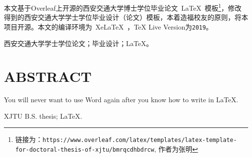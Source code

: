
\clearpage
\titlespacing{\chapter}{0pt}{0mm}{5mm}



本文基于Overleaf上开源的西安交通大学博士学位毕业论文~\LaTeX~模板\footnote{链接为：\texttt{https://www.overleaf.com/latex/templates/latex-template-for-doctoral-thesis-of-xjtu/bmrqcdhbdrcw}, 作者为张明}，修改得到的西安交通大学学士学位毕业设计（论文）模板，本着造福校友的原则，将本项目开源。{\color{red}本文的编译环境为~XeLaTeX~，TeX Live Version为\texttt{2019}}。

\vspace{\baselineskip}
 西安交通大学学士学位论文；毕业设计；\LaTeX。


\clearpage
{}
{}

\titlespacing{\chapter}{0pt}{0mm}{5mm}
\chapter*{ABSTRACT}

\noindent You will never want to use Word again after you know how to write in \LaTeX.

\vspace{\baselineskip}
 XJTU B.S. thesis; \LaTeX.


\titlespacing{\chapter}{0pt}{-6mm}{5mm}
\clearpage{\pagestyle{empty}\cleardoublepage}
